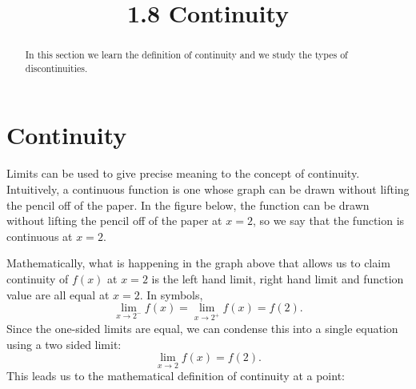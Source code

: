\documentclass{ximera}
\title{1.8 Continuity}
\begin{document}
\begin{abstract}
In this section we learn the definition of continuity and we study the types of discontinuities.
\end{abstract}

\maketitle






\section{Continuity}

Limits can be used to give precise meaning to the concept of continuity. Intuitively, a continuous function is one whose graph can be drawn
without lifting the pencil off of the paper. In the figure below, the function can be drawn without lifting the pencil 
off of the paper at $x = 2$, so we say that the function is continuous at $x = 2$.

\begin{image}
\end{image}
Mathematically, what is happening in the graph above that allows us to claim continuity of $f(x)$ at $x = 2$ 
is the left hand limit, right hand limit and function value are all equal at $x = 2$.
In symbols,
\[
\lim_{x\to 2^-} f(x) = \lim_{x\to 2^+} f(x) = f(2).
\]
Since the one-sided limits are equal, we can condense this into a single equation using a two sided limit:
\[
\lim_{x\to 2} f(x) = f(2).
\]
This leads us to the mathematical definition of continuity at a point:
\end{document}
